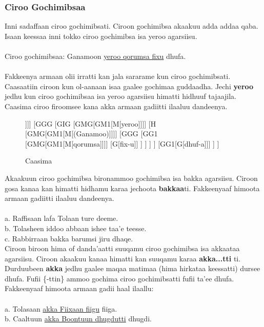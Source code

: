 \documentclass[11pt,b5paper]{book}
\begin{document}
\subsubsection{Ciroo Gochimibsaa}
Inni sadaffaan ciroo gochimibsati. Ciroon gochimibsa akaakuu adda addaa qaba. Isaan keessaa inni tokko ciroo gochimibsa isa yeroo agarsiisu.\\
\\
Ciroo gochimibsaa: Ganamoon \underline{yeroo qorumsa fixu} dhufa.\\
\\
Fakkeenya armaan olii irratti kan jala sararame kun ciroo gochimibsati. Caasaatiin ciroon kun ol-aanaan isaa gaalee gochimaa guddaadha. Jechi \textbf{yeroo} jedhu kun ciroo gochimibsaa
isa yeroo agarsiisu himatti hidhuuf tajaajila. Caasima ciroo firoomsee kana akka armaan gadiitti ilaaluu dandeenya. 

\begin{figure}[H]
	\caption{Caasima}
	\centering
	\begin{forest}
		[H
			[GMG[GM1[M[Ganamoon]]]]
			[GGG
				[GIG
					[GMG[GM1[M[yeroo]]]]
					[H
						[GMG[GM1[M[(Ganamoo)]]]]
						[GGG							
							[GG1
								[GMG[GM1[M[qorumsa]]]]
								[G[fix-u]]
							]
						]
					]
				]
				[GG1[G[dhuf-a]]]
			]
		]
	\end{forest}
\end{figure}

Akaakuun ciroo gochimibsa bironammoo gochimibsa isa bakka agarsiisu. Ciroon gosa kanaa kan himatti hidhamu karaa jechoota \textbf{bakkaa}ti. Fakkeenyaaf himoota armaan gadiitti ilaaluu dandeenya.\\
\\
a. Raffisaan lafa Tolaan ture deeme.\\
b. Tolasheen iddoo abbaan ishee taa’e teesse.\\
c. Rabbirraan bakka barumsi jiru dhaqe. \\

Ciroon biroon hima of danda’aatti suuqamu ciroo gochimibsa isa akkaataa agarsiisu. Ciroon akaakuu kanaa himatti kan suuqamu karaa \textbf{akka...tti} ti. Durduubeen \textbf{akka} jedhu gaalee
maqaa matimaa (hima hirkataa keessatti) dursee dhufa. Fufii \{-ttin\} ammoo gochima ciroo gochimibsatti fufii ta’ee dhufa. Fakkeenyaaf himoota armaan gadii haal ilaallu: \\
\\
a. Tolasaan \underline{akka Fiixaan fiigu} fiiga.\\
b. Caaltuun \underline{akka Boontuun dhugdutti} dhugdi. \\
\end{document}
